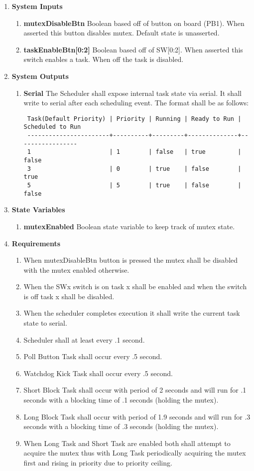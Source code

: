 \documentclass{article}
\newcommand{\bitem}[1]{\item \textbf{#1}}
\begin{document}
\begin{enumerate}
\bitem{System Inputs}
	\begin{enumerate}
	\bitem{mutexDisableBtn} Boolean based off of button on board (PB1). When asserted this button disables mutex. Default state is unasserted.
	\bitem{taskEnableBtn[0:2]} Boolean based off of SW[0:2]. When asserted this switch enables a task. When off the task is disabled.
	\end{enumerate}
\bitem{System Outputs}
	\begin{enumerate}
	\bitem{Serial} The Scheduler shall expose internal task state via serial. It shall write to serial after each scheduling event. The format shall be as follows:
\begin{verbatim}
 Task(Default Priority) | Priority | Running | Ready to Run | Scheduled to Run
 -----------------------+----------+---------+--------------+-----------------
 1                      | 1        | false   | true         | false
 3                      | 0        | true    | false        | true
 5                      | 5        | true    | false        | false
\end{verbatim}
	\end{enumerate}
\bitem{State Variables}
	\begin{enumerate}
	\bitem{mutexEnabled} Boolean state variable to keep track of mutex state.
	\end{enumerate}
\bitem{Requirements}
	\begin{enumerate}
	\item When mutexDisableBtn button is pressed the mutex shall be disabled with the mutex enabled otherwise.
	\item When the SWx switch is on task x shall be enabled and when the switch is off task x shall be disabled.
	\item When the scheduler completes execution it shall write the current task state to serial.
	\item Scheduler shall at least every .1 second.
	\item Poll Button Task shall occur every .5 second.
	\item Watchdog Kick Task shall occur every .5 second.
	\item Short Block Task shall occur with period of 2 seconds and will run for .1 seconds with a blocking time of .1 seconds (holding the mutex).	
	\item Long Block Task shall occur with period of 1.9 seconds and will run for .3 seconds with a blocking time of .3 seconds (holding the mutex).
	\item When Long Task and Short Task are enabled both shall attempt to acquire the mutex thus with Long Task periodically acquiring the mutex first and rising in priority due to priority ceiling.
	\end{enumerate}
\end{enumerate}
\end{document}
